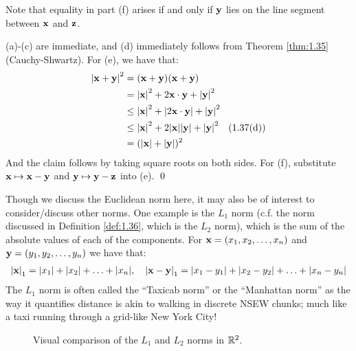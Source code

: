 \noindent Note that equality in part (f) arises if and only if $\mathbf{y}$ lies on the line segment between $\mathbf{x}$ and $\mathbf{z}$.

\begin{nproof}
    (a)-(c) are immediate, and (d) immediately follows from Theorem \ref{thm:1.35} (Cauchy-Shwartz). For (e), we have that:
    \begin{align*}
        \abs{\mathbf{x} + \mathbf{y}}^2 &= (\mathbf{x} + \mathbf{y})(\mathbf{x} + \mathbf{y})
        \\ &= \abs{\mathbf{x}}^2 + 2\mathbf{x}\cdot\mathbf{y} + \abs{\mathbf{y}}^2
        \\ &\leq \abs{\mathbf{x}}^2 + \abs{2\mathbf{x}\cdot\mathbf{y}} + \abs{\mathbf{y}}^2
        \\ &\leq \abs{\mathbf{x}}^2 + 2\abs{\mathbf{x}}\abs{\mathbf{y}} + \abs{\mathbf{y}}^2 \quad \text{(1.37(d))}
        \\ &= (\abs{\mathbf{x}} + \abs{\mathbf{y}})^2
    \end{align*}
    And the claim follows by taking square roots on both sides. For (f), substitute $\mathbf{x} \mapsto \mathbf{x} - \mathbf{y}$ and $\mathbf{y} \mapsto \mathbf{y} - \mathbf{z}$ into (e). \qed
\end{nproof}

Though we discuss the Euclidean norm here, it may also be of interest to consider/discuss other norms. One example is the $L_1$ norm (c.f. the norm discussed in Definition \ref{def:1.36}, which is the $L_2$ norm), which is the sum of the absolute values of each of the components. For $\mathbf{x} = (x_1, x_2, \ldots, x_n)$ and $\mathbf{y} = (y_1, y_2, \ldots, y_n)$ we have that:
\begin{align*}
    \abs{\mathbf{x}}_1 = \abs{x_1} + \abs{x_2} + \ldots + \abs{x_n}, \quad \abs{\mathbf{x} - \mathbf{y}}_{1} = \abs{x_1 - y_1} + \abs{x_2 - y_2} + \ldots + \abs{x_n - y_n}
\end{align*}
The $L_1$ norm is often called the ``Taxicab norm'' or the ``Manhattan norm'' as the way it quantifies distance is akin to walking in discrete NSEW chunks; much like a taxi running through a grid-like New York City!
\begin{figure}[htbp]
    \centering
    \caption{Visual comparison of the $L_1$ and $L_2$ norms in $\mathbb{R}^2$.}
    \label{fig4}
\end{figure}

